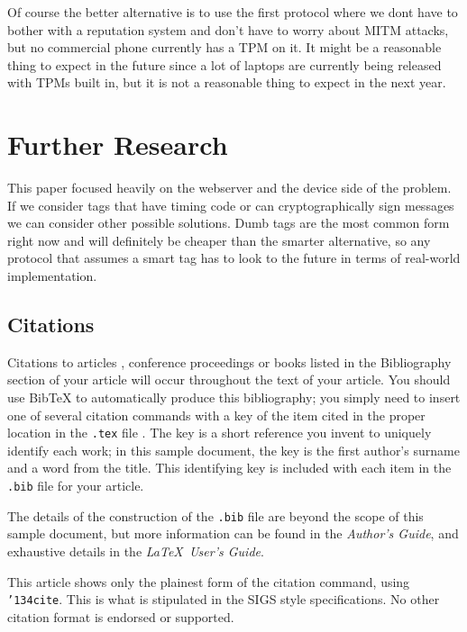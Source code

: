 \documentclass{sig-alternate}
\begin{document}
Of course the better alternative is to use the first protocol where we
dont have to bother with a reputation system and don't have to worry
about MITM attacks, but no commercial phone currently has a TPM on
it. It might be a reasonable thing to expect in the future since a lot
of laptops are currently being released with TPMs built in, but it is
not a reasonable thing to expect in the next year.

\section{Further Research}
This paper focused heavily on the webserver and the device side of the
problem. If we consider tags that have timing code or can
cryptographically sign messages we can consider other possible
solutions. Dumb tags are the most common form right now and will
definitely be cheaper than the smarter alternative, so any protocol
that assumes a smart tag has to look to the future in terms of
real-world implementation.

\subsection{Citations}
Citations to articles \cite{bowman:reasoning,
clark:pct, braams:babel, herlihy:methodology},
conference proceedings \cite{clark:pct} or
books \cite{salas:calculus, Lamport:LaTeX} listed
in the Bibliography section of your
article will occur throughout the text of your article.
You should use BibTeX to automatically produce this bibliography;
you simply need to insert one of several citation commands with
a key of the item cited in the proper location in
the \texttt{.tex} file \cite{Lamport:LaTeX}.
The key is a short reference you invent to uniquely
identify each work; in this sample document, the key is
the first author's surname and a
word from the title.  This identifying key is included
with each item in the \texttt{.bib} file for your article.

The details of the construction of the \texttt{.bib} file
are beyond the scope of this sample document, but more
information can be found in the \textit{Author's Guide},
and exhaustive details in the \textit{\LaTeX\ User's
Guide}\cite{Lamport:LaTeX}.

This article shows only the plainest form
of the citation command, using \texttt{{\char'134}cite}.
This is what is stipulated in the SIGS style specifications.
No other citation format is endorsed or supported.
\end{document}
